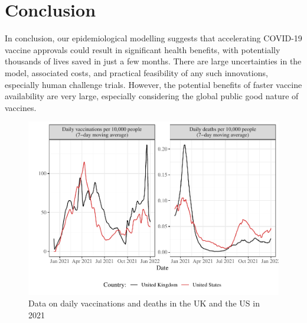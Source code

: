 \documentclass{article}
\begin{document}
\section{Conclusion}\label{conclusion}

In conclusion, our epidemiological modelling suggests that accelerating COVID-19 vaccine approvals could result in significant health benefits, with potentially thousands of lives saved in just a few months. There are large uncertainties in the model, associated costs, and practical feasibility of any such innovations, especially human challenge trials. However, the potential benefits of faster vaccine availability are very large, especially considering the global public good nature of vaccines.



\newpage

\begin{figure}[H]

{\centering \includegraphics[height=0.4\textheight,]{_main_files/figure-latex/baseline-vacc-death-1}

}

\caption{Data on daily vaccinations and deaths in the UK and the US in 2021}\label{fig:baseline-vacc-death}
\end{figure}
\end{document}
